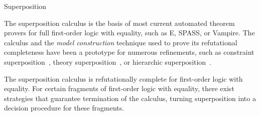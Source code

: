 \begin{entry}{Superposition}
\begin{history}
The superposition calculus is the basis of most current automated
theorem provers for full first-order logic with equality,
such as E, SPASS, or Vampire.
The calculus and the \emph{model construction} technique used
to prove its refutational completeness have been a prototype
for numerous refinements, such as
constraint superposition~,
theory superposition~,
or hierarchic superposition~.

\end{history}

\begin{technicalities}
The superposition calculus is refutationally complete for
first-order logic with equality.
For certain fragments of first-order logic with equality,
there exist strategies that guarantee termination of the calculus,
turning superposition into a decision procedure for these fragments.
\end{technicalities}













\end{entry}
